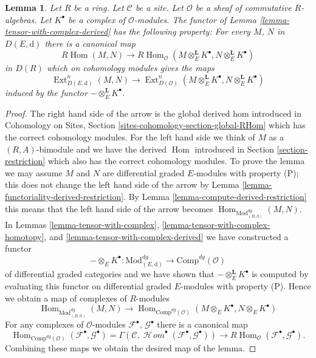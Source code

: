 \documentclass{stacks-project}
\theoremstyle{plain}
\newtheorem{lemma}[subsection]{Lemma}
\theoremstyle{definition}
\theoremstyle{remark}
\numberwithin{equation}{subsection}
\def\Hom{\mathop{\mathrm{Hom}}\nolimits}
\def\Ext{\mathop{\mathrm{Ext}}\nolimits}
\def\SheafHom{\mathop{\mathcal{H}\!\mathit{om}}\nolimits}
\begin{document}
\begin{lemma}
\label{lemma-upgrade-tensor-with-complex-derived}
Let $R$ be a ring. Let $\mathcal{C}$ be a site. Let $\mathcal{O}$
be a sheaf of commutative $R$-algebras. Let $K^\bullet$
be a complex of $\mathcal{O}$-modules.
The functor
of Lemma \ref{lemma-tensor-with-complex-derived} has the following
property: For every $M$, $N$ in $D(E, \text{d})$ there is a
canonical map
$$
R\Hom(M, N)
\longrightarrow
R\Hom_\mathcal{O}(M \otimes_E^\mathbf{L} K^\bullet,
N \otimes_E^\mathbf{L} K^\bullet)
$$
in $D(R)$ which on cohomology modules gives the maps
$$
\Ext^n_{D(E, \text{d})}(M, N) \to
\Ext^n_{D(\mathcal{O})}
(M \otimes_E^\mathbf{L} K^\bullet, N \otimes_E^\mathbf{L} K^\bullet)
$$
induced by the functor $- \otimes_E^\mathbf{L} K^\bullet$.
\end{lemma}

\begin{proof}
The right hand side of the arrow is the global derived hom introduced
in Cohomology on Sites, Section \ref{sites-cohomology-section-global-RHom}
which has the correct cohomology modules.
For the left hand side we think of $M$ as a $(R, A)$-bimodule and
we have the derived $\Hom$ introduced in Section \ref{section-restriction}
which also has the correct cohomology modules.
To prove the lemma we may assume $M$ and $N$ are differential graded
$E$-modules with property (P); this does not change the left hand
side of the arrow by
Lemma \ref{lemma-functoriality-derived-restriction}.
By Lemma \ref{lemma-compute-derived-restriction}
this means that the left hand side of the arrow becomes
$\Hom_{\text{Mod}^{dg}_{(B, \text{d})}}(M, N)$.
In Lemmas \ref{lemma-tensor-with-complex},
\ref{lemma-tensor-with-complex-homotopy}, and
\ref{lemma-tensor-with-complex-derived}
we have constructed a functor
$$
- \otimes_E K^\bullet :
\text{Mod}^{dg}_{(E, \text{d})}
\longrightarrow
\text{Comp}^{dg}(\mathcal{O})
$$
of differential graded categories
and we have shown that $- \otimes_E^\mathbf{L} K^\bullet$ is computed
by evaluating this functor
on differential graded $E$-modules with property (P).
Hence we obtain a map of complexes of $R$-modules
$$
\Hom_{\text{Mod}^{dg}_{(B, \text{d})}}(M, N)
\longrightarrow
\Hom_{\text{Comp}^{dg}(\mathcal{O})}
(M \otimes_E K^\bullet, N \otimes_E K^\bullet)
$$
For any complexes of $\mathcal{O}$-modules
$\mathcal{F}^\bullet$, $\mathcal{G}^\bullet$ there
is a canonical map
$$
\Hom_{\text{Comp}^{dg}(\mathcal{O})}
(\mathcal{F}^\bullet, \mathcal{G}^\bullet) =
\Gamma(\mathcal{C},
\SheafHom^\bullet(\mathcal{F}^\bullet, \mathcal{G}^\bullet))
\longrightarrow
R\Hom_\mathcal{O}(\mathcal{F}^\bullet, \mathcal{G}^\bullet).
$$
Combining these maps
we obtain the desired map of the lemma.
\end{proof}
\end{document}

